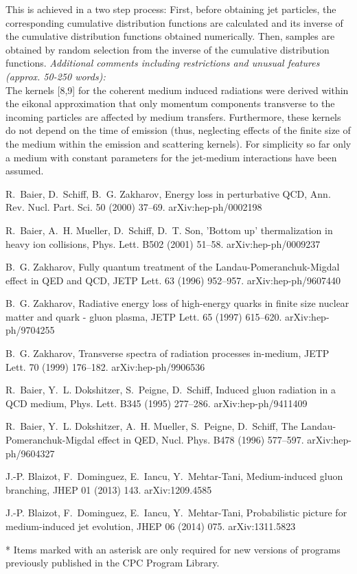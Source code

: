\documentclass[preprint,12pt]{elsarticle}
\begin{document}
\begin{small}
This is achieved in a two step process: First, before obtaining jet particles, the corresponding cumulative distribution functions are calculated and its inverse of the cumulative distribution functions obtained numerically. Then, samples are obtained by random selection from the inverse of the cumulative distribution functions.
{\em Additional comments including restrictions and unusual features (approx. 50-250 words):}\\
The kernels [8,9] for the coherent medium induced radiations were derived within the eikonal approximation that only momentum components transverse to the incoming particles are affected by medium transfers. Furthermore, these kernels do not depend on the time of emission (thus, neglecting effects of the finite size of the medium within the emission and scattering kernels).
For simplicity so far only a medium with constant parameters for the jet-medium interactions have been assumed. 
   \\

\begin{thebibliography}{0}

R.~Baier, D.~Schiff, B.~G. Zakharov, {Energy loss in perturbative QCD}, Ann.
  Rev. Nucl. Part. Sci. 50 (2000) 37--69. arXiv:hep-ph/0002198

R.~Baier, A.~H. Mueller, D.~Schiff, D.~T. Son, {'Bottom up' thermalization in
  heavy ion collisions}, Phys. Lett. B502 (2001) 51--58. arXiv:hep-ph/0009237


B.~G. Zakharov, {Fully quantum treatment of the Landau-Pomeranchuk-Migdal
  effect in QED and QCD}, JETP Lett. 63 (1996) 952--957. arXiv:hep-ph/9607440


B.~G. Zakharov, {Radiative energy loss of high-energy quarks in finite size
  nuclear matter and quark - gluon plasma}, JETP Lett. 65 (1997) 615--620. arXiv:hep-ph/9704255


B.~G. Zakharov, {Transverse spectra of radiation processes in-medium}, JETP
  Lett. 70 (1999) 176--182. arXiv:hep-ph/9906536


R.~Baier, Y.~L. Dokshitzer, S.~Peigne, D.~Schiff, {Induced gluon radiation in a
  QCD medium}, Phys. Lett. B345 (1995) 277--286. arXiv:hep-ph/9411409


R.~Baier, Y.~L. Dokshitzer, A.~H. Mueller, S.~Peigne, D.~Schiff, {The
  Landau-Pomeranchuk-Migdal effect in QED}, Nucl. Phys. B478 (1996) 577--597. arXiv:hep-ph/9604327

  
J.-P. Blaizot, F.~Dominguez, E.~Iancu, Y.~Mehtar-Tani, {Medium-induced gluon
  branching}, JHEP 01 (2013) 143. arXiv:1209.4585

J.-P. Blaizot, F.~Dominguez, E.~Iancu, Y.~Mehtar-Tani, {Probabilistic picture
  for medium-induced jet evolution}, JHEP 06 (2014) 075. arXiv:1311.5823
\end{thebibliography}
* Items marked with an asterisk are only required for new versions
of programs previously published in the CPC Program Library.\\
\end{small}
\end{document}

